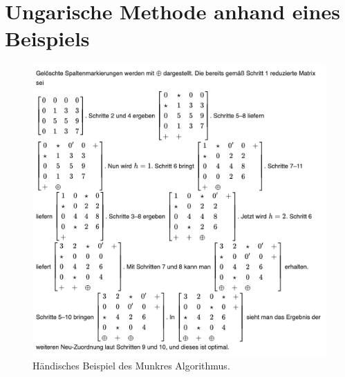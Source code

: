 %
%
%
\section{Ungarische Methode anhand eines Beispiels
\label{munkres:section:teil5}}
\begin{figure}
\centering
\includegraphics[width=14cm]{papers/munkres/figures/beispiel_munkres}
\caption{Händisches Beispiel des Munkres Algorithmus.}
\label{munkres:Vr2}
\end{figure}
